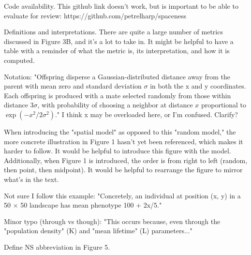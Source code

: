 \begin{point}{}
    Code availability. This github link doesn't work, but is important to be able to evaluate for review: https://github.com/petrelharp/spaceness
\end{point}


\begin{point}{}
    Definitions and interpretations. There are quite a large number of metrics discussed in Figure 3B, and it's a lot to take in. It might be helpful to have a table with a reminder of what the metric is, its interpretation, and how it is computed.
\end{point}


\begin{point}{}
    Notation: "Offspring disperse a Gaussian-distributed distance away from the parent with mean zero and standard deviation $\sigma$ in both the x and y coordinates. Each offspring is produced with a mate selected randomly from those within distance $3\sigma$, with probability of choosing a neighbor at distance $x$ proportional to $\exp(-x^2/2\sigma^2)$." I think x may be overloaded here, or I'm confused. Clarify?
\end{point}


\begin{point}{}
    When introducing the "spatial model" as opposed to this "random model," the more concrete illustration in Figure 1 hasn't yet been referenced, which makes it harder to follow. It would be helpful to introduce this figure with the model. Additionally, when Figure 1 is introduced, the order is from right to left (random, then point, then midpoint). It would be helpful to rearrange the figure to mirror what's in the text.
\end{point}


\begin{point}{}
    Not sure I follow this example: "Concretely, an individual at position (x, y) in a 50 × 50 landscape has mean phenotype 100 + 2x/5."
\end{point}

\reply{
}

\begin{point}{}
    Minor typo (through vs though): "This occurs because, even through the "population density" (K) and "mean lifetime" (L) parameters..."
\end{point}


\begin{point}{}
    Define NS abbreviation in Figure 5.
\end{point}


